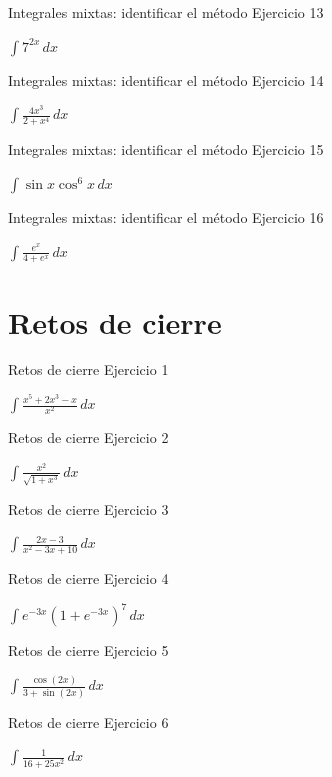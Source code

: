 \documentclass[10pt,aspectratio=169]{beamer}
\newcommand{\ejercicio}[1]{%
  \begin{center}
  \vfill
  {\fontsize{24}{30}\selectfont #1}
  \vfill
  \end{center}
}
\begin{document}
\begin{frame}{Integrales mixtas: identificar el método}
\small Ejercicio 13
\ejercicio{$\displaystyle \int 7^{2x}\,dx$}
\end{frame}

\begin{frame}{Integrales mixtas: identificar el método}
\small Ejercicio 14
\ejercicio{$\displaystyle \int\frac{4x^3}{2+x^4}\,dx$}
\end{frame}

\begin{frame}{Integrales mixtas: identificar el método}
\small Ejercicio 15
\ejercicio{$\displaystyle \int\sin x\cos^6x\,dx$}
\end{frame}

\begin{frame}{Integrales mixtas: identificar el método}
\small Ejercicio 16
\ejercicio{$\displaystyle \int\frac{e^x}{4+e^x}\,dx$}
\end{frame}

\section{Retos de cierre}
\begin{frame}{Retos de cierre}
\small Ejercicio 1
\ejercicio{$\displaystyle \int\frac{x^5+2x^3-x}{x^2}\,dx$}
\end{frame}

\begin{frame}{Retos de cierre}
\small Ejercicio 2
\ejercicio{$\displaystyle \int\frac{x^2}{\sqrt{1+x^3}}\,dx$}
\end{frame}

\begin{frame}{Retos de cierre}
\small Ejercicio 3
\ejercicio{$\displaystyle \int\frac{2x-3}{x^2-3x+10}\,dx$}
\end{frame}

\begin{frame}{Retos de cierre}
\small Ejercicio 4
\ejercicio{$\displaystyle \int e^{-3x}(1+e^{-3x})^7\,dx$}
\end{frame}

\begin{frame}{Retos de cierre}
\small Ejercicio 5
\ejercicio{$\displaystyle \int\frac{\cos(2x)}{3+\sin(2x)}\,dx$}
\end{frame}

\begin{frame}{Retos de cierre}
\small Ejercicio 6
\ejercicio{$\displaystyle \int\frac{1}{16+25x^2}\,dx$}
\end{frame}
\end{document}
